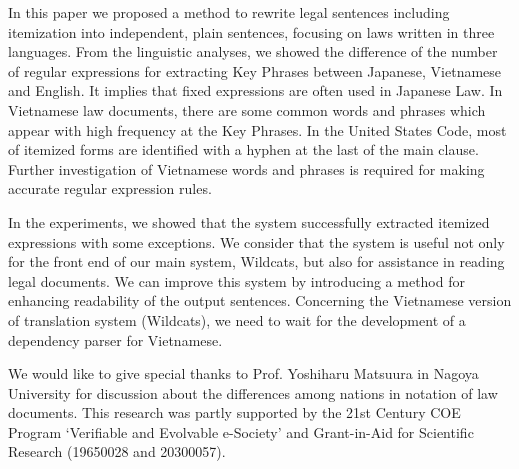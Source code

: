 \documentclass[english]{jnlp_1.4}
\begin{document}
In this paper we proposed a method to rewrite legal sentences including
itemization into independent, plain sentences, focusing on laws written
in three languages.
From the linguistic analyses, we showed the difference of the number of
regular expressions for extracting Key Phrases between Japanese,
Vietnamese and English. 
It implies that fixed expressions are often used in Japanese Law.
In Vietnamese law documents, there are some common words and phrases
which appear with high frequency at the Key Phrases.
In the United States Code, most of itemized forms are identified with a
hyphen at the last of the main clause.
Further investigation of Vietnamese words and phrases is required for
making accurate regular expression rules.

In the experiments, 
we showed that the system successfully extracted
itemized expressions with some exceptions.
We consider that the system is useful not only for the front end of our
main system, Wildcats, but also for assistance in reading 
legal documents.
We can improve this system by introducing a method for
enhancing readability of the output sentences.
Concerning the Vietnamese version of translation system (Wildcats),
we need to wait for the development of a dependency parser for Vietnamese.




\acknowledgment

We would like to give special thanks to Prof. Yoshiharu Matsuura in Nagoya
University for discussion about the differences among nations in notation 
of law documents.
This research was partly supported by the 21st Century COE Program
`Verifiable and Evolvable e-Society' and Grant-in-Aid for Scientific
Research (19650028 and 20300057).  
\end{document}
